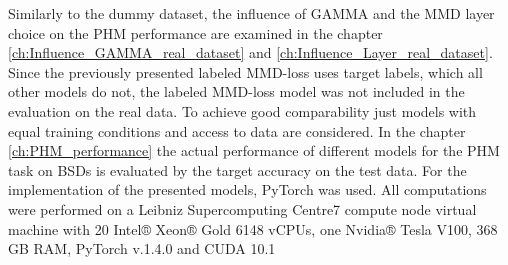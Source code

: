 Similarly to the dummy dataset, the influence of GAMMA and the MMD layer choice on the PHM performance are examined in the chapter \ref{ch:Influence_GAMMA_real_dataset} and \ref{ch:Influence_Layer_real_dataset}. Since the previously presented labeled MMD-loss uses target labels, which all other models do not, the labeled MMD-loss model was not included in the evaluation on the real data. To achieve good comparability just models with equal training conditions and access to data are considered. In the chapter \ref{ch:PHM_performance} the actual performance of different models for the PHM task on BSDs is evaluated by the target accuracy on the test data. For the implementation of the presented models, PyTorch was used.  All computations were performed on a Leibniz Supercomputing Centre7 compute node virtual machine with 20
Intel® Xeon® Gold 6148 vCPUs, one Nvidia® Tesla V100, 368 GB RAM, PyTorch v.1.4.0 and CUDA 10.1


